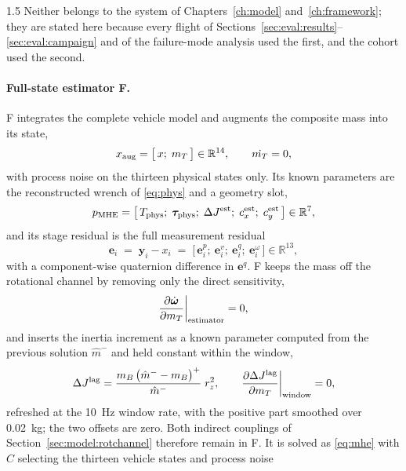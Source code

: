 \begin{spacing}{1.5}
Neither belongs to the system of Chapters~\ref{ch:model} and~\ref{ch:framework};
they are stated here because every flight of
Sections~\ref{sec:eval:results}--\ref{sec:eval:campaign} and of the failure-mode
analysis used the first, and the cohort used the second.

\paragraph{Full-state estimator F.} F integrates the complete vehicle model and
augments the composite mass into its state,
\begin{equation}
x_{\mathrm{aug}} = \bigl[\,x;\; m_T\,\bigr] \in \mathbb{R}^{14},
\qquad \dot{m_T} = 0,
\label{eq:xaug}
\end{equation}
with process noise on the thirteen physical states only. Its known parameters
are the reconstructed wrench of \eqref{eq:phys} and a geometry slot,
\begin{equation}
p_{\mathrm{MHE}} = \bigl[\, T_{\mathrm{phys}};\; \bm{\tau}_{\mathrm{phys}};\; \Delta J^{\mathrm{est}};\; c^{\mathrm{est}}_x;\; c^{\mathrm{est}}_y \,\bigr] \in \mathbb{R}^{7},
\label{eq:pmhe}
\end{equation}
and its stage residual is the full measurement residual
\begin{equation}
\bm e_i \;=\; \bm y_i - x_i
\;=\; \bigl[\,\bm e^p_i;\ \bm e^v_i;\ \bm e^q_i;\ \bm e^{\omega}_i\,\bigr]
\in \mathbb{R}^{13},
\label{eq:mheresid}
\end{equation}
with a component-wise quaternion difference in $\bm e^q$. F keeps the mass off
the rotational channel by removing only the direct sensitivity,
\begin{equation}
\frac{\partial \dot{\bm\omega}}{\partial m_T}\bigg|_{\text{estimator}} = 0 ,
\label{eq:nodwdm}
\end{equation}
and inserts the inertia increment as a known parameter computed from the previous
solution $\hat m^{-}$ and held constant within the window,
\begin{equation}
\Delta J^{\mathrm{lag}} = \frac{m_B\,\bigl(\hat m^{-}-m_B\bigr)^{+}}{\hat m^{-}}\; r_z^2,
\qquad
\frac{\partial \Delta J^{\mathrm{lag}}}{\partial m_T}\bigg|_{\text{window}} = 0,
\label{eq:Afrozen}
\end{equation}
refreshed at the \SI{10}{\hertz} window rate, with the positive part smoothed over
\SI{0.02}{\kg}; the two offsets are zero. Both indirect couplings of
Section~\ref{sec:model:rotchannel} therefore remain in F. It is solved as
\eqref{eq:mhe} with $C$ selecting the thirteen vehicle states and process noise

\end{spacing}
